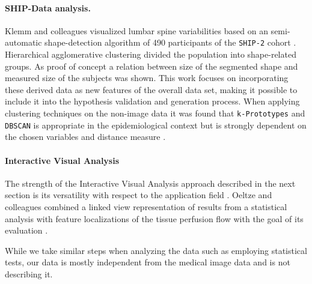 \documentclass[journal]{style/vgtc} 			          %
\begin{document}
\paragraph{SHIP-Data analysis.}
Klemm and colleagues visualized lumbar spine variabilities based on an semi-automatic shape-detection algorithm of 490 participants of the \texttt{SHIP-2} cohort \cite{Klemm2013VMV}.
%
Hierarchical agglomerative clustering divided the population into shape-related groups.
%
As proof of concept a relation between size of the segmented shape and measured size of the subjects was shown.
%
This work focuses on incorporating these derived data as new features of the overall data set, making it possible to include it into the hypothesis validation and generation process.
%
When applying clustering techniques on the non-image data it was found that \texttt{k-Prototypes} and \texttt{DBSCAN} is appropriate in the epidemiological context but is strongly dependent on the chosen variables and distance measure \cite{Klemm2014BVM}.

\paragraph{Interactive Visual Analysis}
The strength of the Interactive Visual Analysis approach described in the next section is its versatility with respect to the application field \cite{Konyha2009}.
%
Oeltze and colleagues combined a linked view representation of results from a statistical analysis with feature localizations of the tissue perfusion flow with the goal of its evaluation \cite{Oeltze2007}.
%

While we take similar steps when analyzing the data such as employing statistical tests, our data is mostly independent from the medical image data and is not describing it. %
\end{document}
